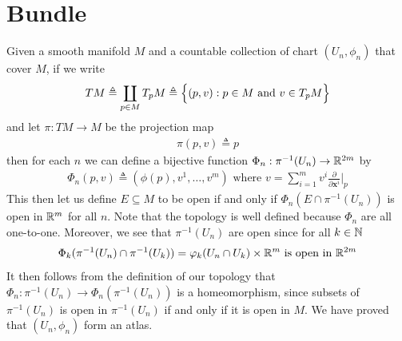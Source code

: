 \documentclass{report}
\begin{document}
\section{Bundle}
\begin{abstract}

\end{abstract}
\begin{mdframed}
Given a smooth manifold $M$ and a countable collection of chart $(U_n, \phi_n) $ that cover $M$, if we write 
 \begin{align*}
TM\triangleq \coprod _{p \in M} T_pM\triangleq \Big\{ (p,v): p \in M\text{ and }v \in T_pM \Big\}
\end{align*}
and let $\pi:TM\rightarrow M$ be the projection map 
\begin{align*}
\pi (p,v)\triangleq p
\end{align*}
then for each $n$ we can define a bijective function  $\Phi_n:\pi^{-1}(U_n)\rightarrow \mathbb{R}^{2m}$ by 
\begin{align*}
  \Phi_n (p,v)\triangleq  (\phi (p), v^1,\dots ,v^m)\text{ where }v=\sum_{i=1}^m v^i \frac{\partial }{\partial \textbf{x}^i}\Big|_p
\end{align*}
This then let us define $E\subseteq M$ to be open if and only if $\Phi_n (E\cap \pi^{-1}(U_n))$ is open in $\mathbb{R}^m$ for all  $n$. Note that  the topology is well defined because $\Phi_n$ are all one-to-one. Moreover, we see that $\pi^{-1}(U_n)$ are open since for all $k\in\mathbb{N}$
\begin{align*}
\Phi_k (\pi^{-1}(U_n)\cap \pi^{-1}(U_k))= \varphi_k(U_n \cap U_k)\times \mathbb{R}^m\text{ is open in }\mathbb{R}^{2m}
\end{align*}
It then follows from the definition of our topology that $\Phi_n:\pi^{-1}(U_n)\rightarrow \Phi_n(\pi^{-1}(U_n))$ is a homeomorphism, since subsets of $\pi^{-1}(U_n)$ is open in $\pi^{-1}(U_n)$ if and only if it is open in $M$. We have proved that $(U_n,\phi_n)$ form an atlas. \\


\end{mdframed}
\end{document}
